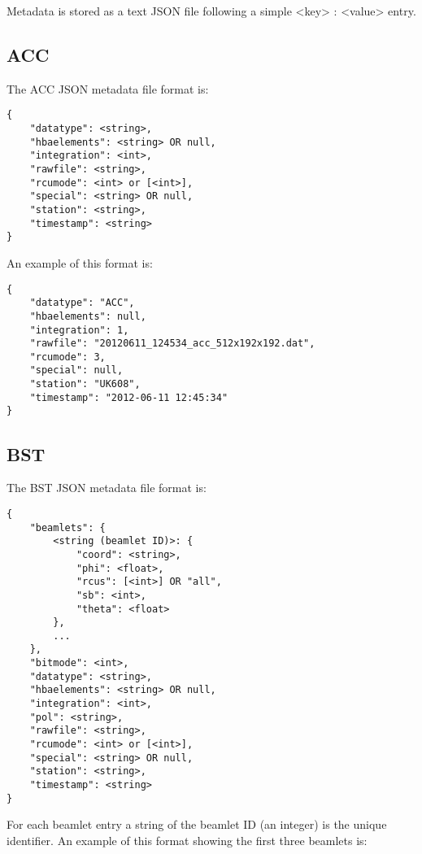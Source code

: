 \documentclass[10pt,a4paper]{article}
\begin{document}
Metadata is stored as a text JSON file following a simple <key> : <value> entry.

\subsection{ACC}

The ACC JSON metadata file format is:

\begin{verbatim}
{
    "datatype": <string>,
    "hbaelements": <string> OR null,
    "integration": <int>,
    "rawfile": <string>,
    "rcumode": <int> or [<int>],
    "special": <string> OR null,
    "station": <string>,
    "timestamp": <string>
}
\end{verbatim}

\noindent An example of this format is:

\begin{verbatim}
{
    "datatype": "ACC",
    "hbaelements": null,
    "integration": 1,
    "rawfile": "20120611_124534_acc_512x192x192.dat",
    "rcumode": 3,
    "special": null,
    "station": "UK608",
    "timestamp": "2012-06-11 12:45:34"
}
\end{verbatim}

\subsection{BST}

The BST JSON metadata file format is:

\begin{verbatim}
{
    "beamlets": {
        <string (beamlet ID)>: {
            "coord": <string>,
            "phi": <float>,
            "rcus": [<int>] OR "all",
            "sb": <int>,
            "theta": <float>
        },
		...
    },
    "bitmode": <int>,
    "datatype": <string>,
    "hbaelements": <string> OR null,
    "integration": <int>,
    "pol": <string>,
    "rawfile": <string>,
    "rcumode": <int> or [<int>],
    "special": <string> OR null,
    "station": <string>,
    "timestamp": <string>
}
\end{verbatim}

\noindent For each beamlet entry a string of the beamlet ID (an integer) is the
unique identifier. An example of this format showing the first three beamlets is:
\end{document}
